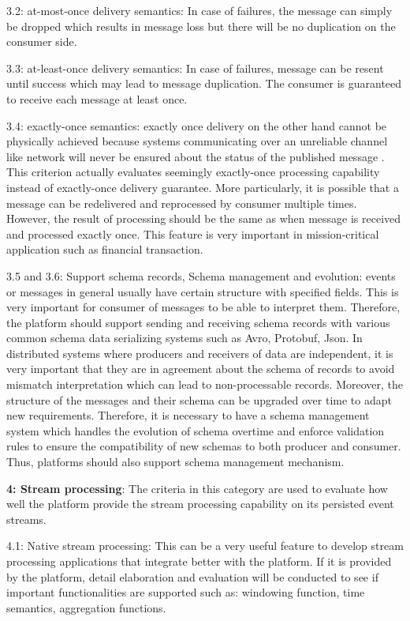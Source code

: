 3.2: at-most-once delivery semantics: In case of failures, the message can simply be dropped which results in message loss but there will be no duplication on the consumer side.

3.3: at-least-once delivery semantics: In case of failures, message can be resent until success which may lead to message duplication. The consumer is guaranteed to receive each message at least once. 

3.4: exactly-once semantics: exactly once delivery on the other hand cannot be physically achieved because systems communicating over an unreliable channel like network will never be ensured about the status of the published message \cite{exactlyoncenotpossible}. This criterion actually evaluates seemingly exactly-once processing capability instead of exactly-once delivery guarantee. More particularly, it is possible that a message can be redelivered and reprocessed by consumer multiple times. However, the result of processing should be the same as when message is received and processed exactly once. This feature is very important in mission-critical application such as financial transaction.

3.5 and 3.6: Support schema records, Schema management and evolution: events or messages in general usually have certain structure with specified fields. This is very important for consumer of messages to be able to interpret them. Therefore, the platform should support sending and receiving schema records with various common schema data serializing systems such as Avro, Protobuf, Json. 
In distributed systems where producers and receivers of data are independent, it is very important that they are in agreement about the schema of records to avoid mismatch interpretation which can lead to non-processable records. Moreover, the structure of the messages and their schema can be upgraded over time to adapt new requirements. Therefore, it is necessary to have a schema management system which handles the evolution of schema overtime and enforce validation rules to ensure the compatibility of new schemas to both producer and consumer. Thus, platforms should also support schema management mechanism.

\textbf{4: Stream processing}: The criteria in this category are used to evaluate how well the platform provide the stream processing capability on its persisted event streams.

4.1: Native stream processing: This can be a very useful feature to develop stream processing applications that integrate better with the platform. If it is provided by the platform, detail elaboration and evaluation will be conducted to see if important functionalities are supported such as: windowing function, time semantics, aggregation functions.

